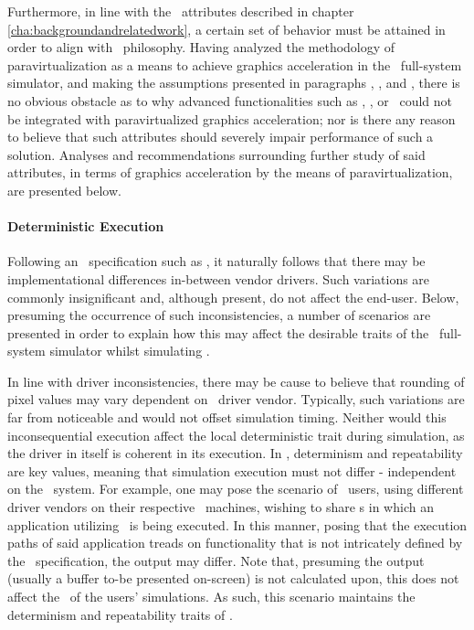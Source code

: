 Furthermore, in line with the \dvttermsimics\ attributes described in chapter \ref{cha:backgroundandrelatedwork}, a certain set of behavior must be attained in order to align with \dvttermsimics\ philosophy.
Having analyzed the methodology of paravirtualization as a means to achieve graphics acceleration in the \dvttermsimics\ full-system simulator, and making the assumptions presented in paragraphs , , and , there is no obvious obstacle as to why advanced functionalities such as \dvttermdeterministicexecution , \dvttermcheckpointing , or \dvttermreverseexecution\ could not be integrated with paravirtualized graphics acceleration; nor is there any reason to believe that such attributes should severely impair performance of such a solution.
Analyses and recommendations surrounding further study of said attributes, in terms of graphics acceleration by the means of paravirtualization, are presented below.

\paragraph{Deterministic Execution}
\label{par:discussion_deterministicexecution}
Following an \dvttermapi\ specification such as \dvttermopengles , it naturally follows that there may be implementational differences in-between vendor drivers.
Such variations are commonly insignificant and, although present, do not affect the end-user.
Below, presuming the occurrence of such inconsistencies, a number of scenarios are presented in order to explain how this may affect the desirable traits of the \dvttermsimics\ full-system simulator whilst simulating \dvttermopengles .

In line with driver inconsistencies, there may be cause to believe that rounding of pixel values may vary dependent on \dvttermhost\ driver vendor.
Typically, such variations are far from noticeable and would not offset simulation timing.
Neither would this inconsequential execution affect the local deterministic trait during simulation, as the driver in itself is coherent in its execution.
In \dvttermsimics , determinism and repeatability are key values, meaning that simulation execution must not differ - independent on the \dvttermhost\ system.
For example, one may pose the scenario of \dvttermsimics\ users, using different driver vendors on their respective \dvttermhost\ machines, wishing to share \dvttermcheckpoint s in which an application utilizing \dvttermopengles\ is being executed.
In this manner, posing that the execution paths of said application treads on functionality that is not intricately defined by the \dvttermopengles\ specification, the output may differ.
Note that, presuming the output (usually a buffer to-be presented on-screen) is not calculated upon, this does not affect the \dvttermtiming\ of the users' simulations.
As such, this scenario maintains the determinism and repeatability traits of \dvttermsimics .

